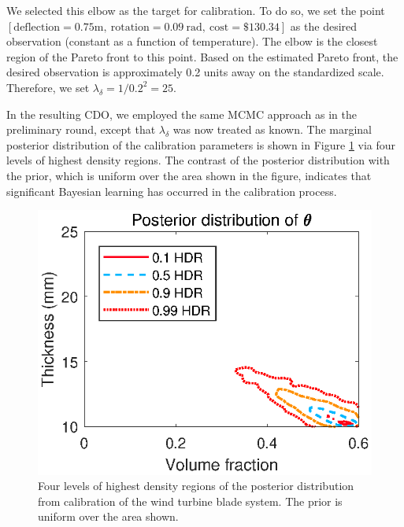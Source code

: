\documentclass{article}
\begin{document}
%
We selected this elbow as the target for calibration.
%
To do so, we set the point $[\mathrm{deflection}=0.75\mathrm m,\ 
\mathrm{rotation}=0.09\ \mathrm{rad},\ 
\mathrm{cost}=\$130.34]$
 as the desired observation (constant as a function of temperature).
%
The elbow is the closest region of the Pareto front to this point.
%
Based on the estimated Pareto front, the desired observation is approximately 0.2 units away on the standardized scale.
%
Therefore, we set $\lambda_\delta=1/0.2^2=25.$
%

In the resulting CDO, we employed the same MCMC approach as in the preliminary round, except that $\lambda_\delta$ was now treated as known.
%
The marginal posterior distribution of the calibration parameters is shown in Figure \ref{fig:wt_marg_post} via four levels of highest density regions.
%
The contrast of the posterior distribution with the prior, which is uniform over the area shown in the figure, indicates that significant Bayesian learning has occurred in the calibration process.
%
\begin{figure}
\centering
\includegraphics[scale=0.8]{FIG_post_dist_contourplot}
\captionsetup{width=.7\linewidth}
\caption{Four levels of highest density regions of the posterior distribution from calibration of the wind turbine blade system. The prior is uniform over the area shown.}
\label{fig:wt_marg_post}
\end{figure}
\end{document}
